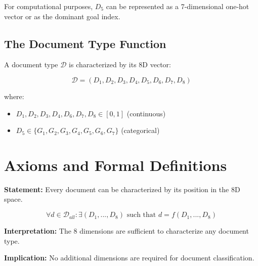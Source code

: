 For computational purposes, $D_5$ can be represented as a 7-dimensional one-hot
vector or as the dominant goal index.

\subsection{The Document Type Function}

\begin{tcolorbox}[colback=gray!5!white, colframe=gray!75!black,
    title=Definition: Document Type Vector]

A document type $\mathcal{D}$ is characterized by its 8D vector:

\begin{equation}
\mathcal{D} = (D_1, D_2, D_3, D_4, D_5, D_6, D_7, D_8)
\end{equation}

where:
\begin{itemize}[nosep]
\item $D_1, D_2, D_3, D_4, D_6, D_7, D_8 \in [0, 1]$ (continuous)
\item $D_5 \in \{G_1, G_2, G_3, G_4, G_5, G_6, G_7\}$ (categorical)
\end{itemize}

\end{tcolorbox}


\section{Axioms and Formal Definitions}
\label{sec:doctype-axioms}

\begin{tcolorbox}[colback=gray!5!white, colframe=gray!75!black,
    title=Axiom DOC-1: Dimension Completeness]
\textbf{Statement:} Every document can be characterized by its position in the 8D space.

\begin{equation}
\forall d \in \mathcal{D}_{all}: \exists (D_1, ..., D_8) \text{ such that } d = f(D_1, ..., D_8)
\end{equation}

\textbf{Interpretation:} The 8 dimensions are sufficient to characterize any document type.

\textbf{Implication:} No additional dimensions are required for document classification.
\end{tcolorbox}

